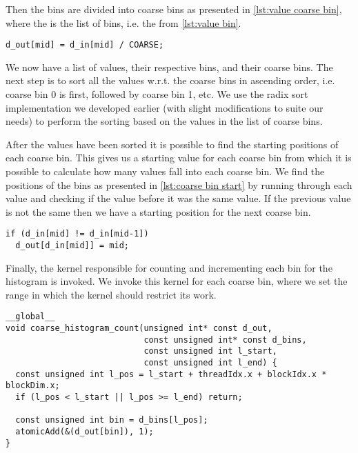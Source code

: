Then the bins are divided into coarse bins as presented in \cref{lst:value coarse bin}, where the  is the list of bins, i.e. the  from \cref{lst:value bin}.

\begin{lstlisting}[caption={compute each value's coarse bin}, label={lst:value coarse bin}, numbers=none]
d_out[mid] = d_in[mid] / COARSE;
\end{lstlisting}

We now have a list of values, their respective bins, and their coarse bins.
The next step is to sort all the values w.r.t. the coarse bins in ascending order, i.e. coarse bin 0 is first, followed by coarse bin 1, etc.
We use the radix sort implementation we developed earlier (with slight modifications to suite our needs) to perform the sorting based on the values in the list of coarse bins.

After the values have been sorted it is possible to find the starting positions of each coarse bin.
This gives us a starting value for each coarse bin from which it is possible to calculate how many values fall into each coarse bin.
We find the positions of the bins as presented in \cref{lst:coarse bin start} by running through each value and checking if the value before it was the same value.
If the previous value is not the same then we have a starting position for the next coarse bin.

\begin{lstlisting}[caption={find the start positions of each coarse bin}, label={lst:coarse bin start}, numbers=none]
if (d_in[mid] != d_in[mid-1])
  d_out[d_in[mid]] = mid;
\end{lstlisting}

Finally, the kernel responsible for counting and incrementing each bin for the histogram is invoked.
We invoke this kernel for each coarse bin, where we set the range in which the kernel should restrict its work.

\begin{lstlisting}[caption={kernel to do histogram count for each coarse bin}, label={lst:coarse histo kernel}]
__global__
void coarse_histogram_count(unsigned int* const d_out,
                            const unsigned int* const d_bins,
                            const unsigned int l_start,
                            const unsigned int l_end) {
  const unsigned int l_pos = l_start + threadIdx.x + blockIdx.x * blockDim.x;
  if (l_pos < l_start || l_pos >= l_end) return;

  const unsigned int bin = d_bins[l_pos];
  atomicAdd(&(d_out[bin]), 1);
}
\end{lstlisting}

